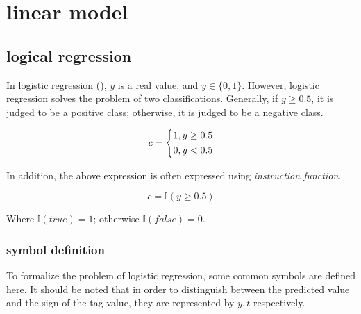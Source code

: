 \begin{savequote}[45mm]
\end{savequote}

\chapter{linear model} 
\label{ch:linear-model}

\section{logical regression}

\begin{content}

In logistic regression (), $y$ is a real value, and $y \in \{ 0,1\}$. However, logistic regression solves the problem of two classifications. Generally, if $y \ge 0.5$, it is judged to be a positive class; otherwise, it is judged to be a negative class.

\[c = \left\{ \begin{gathered}
  1,y \ge 0.5 \hfill \\
  0,y < 0.5 \hfill \\ 
\end{gathered} \right.\]

In addition, the above expression is often expressed using \emph{instruction function}.

\[
c = \mathbb I(y \ge 0.5)
\]

Where $\mathbb I(true) = 1$; otherwise $\mathbb I(false) = 0$.

\subsection{symbol definition}

To formalize the problem of logistic regression, some common symbols are defined here. It should be noted that in order to distinguish between the predicted value and the sign of the tag value, they are represented by $y, t$ respectively.


\end{content}
